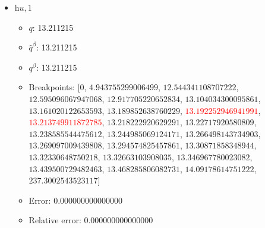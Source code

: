 \documentclass{article}%
\begin{document}
\begin{itemize}
\begin{itemize}
		\item Error: 0.000000000000000%
		\item Relative error: 0.000000000000000%
	\end{itemize}%
	\item $\textit{hu},1$%
	\begin{itemize}%
		\item $q$: 13.211215%
		\item $\hat{q}^\beta$: 13.211215%
		\item $q^\beta$: 13.211215%
		\item Breakpoints: $[$$0$, $4.943755299006499$, $12.544341108707222$, $12.595096067947068$, $12.917705220652834$, $13.104034300095861$, $13.161020122653593$, $13.189852638760229$, \textcolor{red}{$13.192252946941991$}, \textcolor{red}{$13.213749911872785$}, $13.218222920629291$, $13.22717920580809$, $13.238585544475612$, $13.244985069124171$, $13.266498143734903$, $13.269097009439808$, $13.294574825457861$, $13.30871858348944$, $13.32330648750218$, $13.32663103908035$, $13.346967780023082$, $13.439500729482463$, $13.468285806082731$, $14.09178614751222$, $237.3002543523117$$]$%
		\item Error: 0.000000000000000%
		\item Relative error: 0.000000000000000%
	\end{itemize}%
\end{itemize}%
\end{document}

